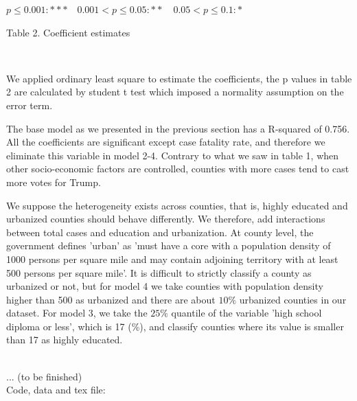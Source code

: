 \documentclass[12pt]{article}
\begin{document}
\centerline{\small $p\leq0.001: *** \ \ \ $  $0.001<p\leq0.05: ** \ \ \ $  $0.05<p\leq0.1: * \ \ \ $  } 

\centerline{ Table 2. Coefficient estimates} \
 

We applied ordinary least square to estimate the coefficients, the p values in table 2 are calculated by student t test which imposed a normality assumption on the error term.

The base model as we presented in the previous section has a R-squared of 0.756. All the coefficients are significant except case fatality rate, and therefore we eliminate this variable in model 2-4. Contrary to what we saw in table 1, when other socio-economic factors are controlled, counties with more cases tend to cast more votes for Trump. 

We suppose the heterogeneity exists across counties, that is, highly educated and urbanized counties should behave differently. We therefore, add interactions between total cases and education and urbanization.  At county level, the government defines 'urban' as 'must have a core with a population density of 1000 persons per square mile and may contain adjoining territory with at least 500 persons per square mile'. It is difficult to strictly classify a county as urbanized or not, but for model 4 we take counties with population density higher than 500 as urbanized and there are  about $10 \%$ urbanized counties in our dataset.  For model 3,  we take the $25\%$ quantile of the variable 'high school diploma or less', which is 17 (\%), and classify counties where its value is smaller than 17 as highly educated.  \\\

... (to be finished) \\


Code, data and tex file: 




 
\end{document}

